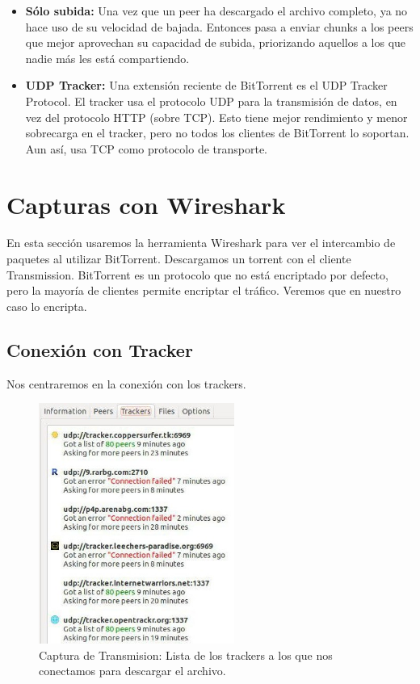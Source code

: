 \documentclass{article}
\begin{document}
\begin{itemize}
\item \textbf{Sólo subida:} Una vez que un peer ha descargado el
  archivo completo, ya no hace uso de su velocidad de bajada. Entonces
  pasa a enviar chunks a los peers que mejor aprovechan su capacidad
  de subida, priorizando aquellos a los que nadie más les está
  compartiendo.

\item \textbf{UDP Tracker:} Una extensión reciente de BitTorrent es el
  UDP Tracker Protocol. El tracker usa el protocolo UDP para la
  transmisión de datos, en vez del protocolo HTTP (sobre TCP). Esto
  tiene mejor rendimiento y menor sobrecarga en el tracker, pero no
  todos los clientes de BitTorrent lo soportan. Aun así, usa TCP como
  protocolo de transporte.
  
\end{itemize}

\section{Capturas con Wireshark}

En esta sección usaremos la herramienta Wireshark para ver el intercambio de paquetes al utilizar BitTorrent. Descargamos un torrent con el cliente Transmission. BitTorrent es un protocolo que no está encriptado por defecto, pero la mayoría de clientes permite encriptar el tráfico. Veremos que en nuestro caso lo encripta.

\subsection{Conexión con Tracker}

Nos centraremos en la conexión con los trackers.

\begin{figure}[H]
  \centering
  \includegraphics[width=64mm]{imagenes/tracker_transmission}
  \caption{Captura de Transmision: Lista de los trackers a los que nos conectamos para descargar el archivo.}
\end{figure}
\end{document}
